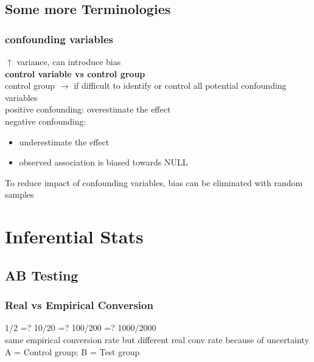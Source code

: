 \documentclass{beamer}
\begin{document}
\subsection{Some more Terminologies}

\begin{frame}\frametitle{confounding variables}
	$\uparrow$ variance, can introduce bias\\
	\textbf{control variable vs control group}\\
	control group $\rightarrow$ if difficult to identify or control all potential confounding variables\\
	positive confounding: overestimate the effect\\
	negative confounding: 
	\begin{itemize}
		\item underestimate the effect
		\item observed association is biased towards NULL
	\end{itemize}
	To reduce impact of confounding variables, bias can be eliminated with random samples
\end{frame}










\section{Inferential Stats}


\subsection{AB Testing}

\begin{frame}\frametitle{Real vs Empirical Conversion}
	1/2 =? 10/20 =? 100/200 =? 1000/2000\\
	same empirical conversion rate but different real conv rate because of uncertainty\\
	A = Control group; B = Test group\\
\end{frame}
\end{document}
